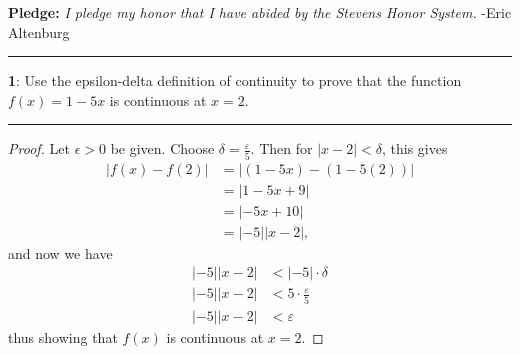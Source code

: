 \documentclass[11pt]{article}
\newcommand\question[2]{\vspace{.25in}\hrule\textbf{#1}: #2\vspace{.5em}\hrule\vspace{.10in}}
\begin{document}
\raggedright
\newcommand\NAME{Eric Altenburg}  %
\newcommand\COURSE{MA-240}
\newcommand\HWNUM{11 Corrections}              %


\textbf{Pledge:} \textit{I pledge my honor that I have abided by the Stevens Honor System.} -Eric Altenburg

\question{1}{Use the epsilon-delta definition of continuity to prove that the function $f(x) = 1-5x$ is continuous at $x=2$.}

\begin{proof}
	Let $\epsilon > 0$ be given. Choose $\delta = \frac{\varepsilon}{5}$. Then for $|x-2| < \delta$, this gives 
	\begin{align*}
		|f(x)-f(2)| &= |(1-5x)-(1-5(2))|\\
		&= |1-5x + 9|\\
		&= |-5x+10|\\
		&= |-5||x-2|,
	\end{align*}
	and now we have
	\begin{align*}
		|-5||x-2| &< |-5| \cdot \delta\\
		|-5||x-2| &< 5 \cdot \frac{\varepsilon}{5}\\
		|-5||x-2| &< \varepsilon
	\end{align*}
	thus showing that $f(x)$ is continuous at $x=2$.
\end{proof}
\end{document}
